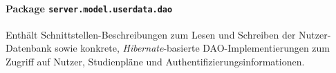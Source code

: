 \FloatBarrier
\paragraph[Package server.model.userdata.dao]{Package \texttt{server.model.userdata.dao}}
Enthält Schnittstellen-Beschreibungen zum Lesen und Schreiben der Nutzer-Datenbank sowie konkrete, \emph{Hibernate}-basierte DAO-Implementierungen zum Zugriff auf Nutzer, Studienpläne und Authentifizierungsinformationen.
       